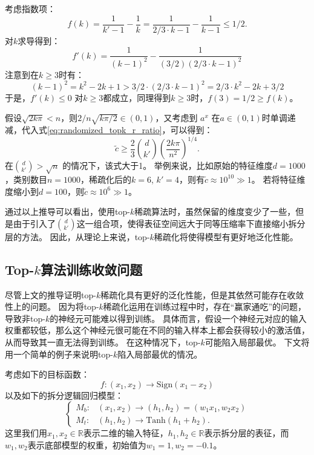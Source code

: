 考虑指数项：
\begin{equation}
    f(k) = \dfrac{1}{k' - 1} - \dfrac{1}{k} = \dfrac{1}{2/3 \cdot k - 1} - \dfrac{1}{k - 1} \le 1/2.
\end{equation}
%
对$k$求导得到：
\begin{equation}
    f'(k) = \dfrac{1}{(k - 1)^2} - \dfrac{1}{(3/2)(2/3 \cdot k - 1)^2}
\end{equation}
%
注意到在$k \ge 3$时有：
\begin{equation}
    (k - 1)^2 = k^2 - 2k + 1 > 3/2 \cdot (2/3\cdot k - 1)^2 = 2/3 \cdot k^2 -2k + 3/2
\end{equation}
%
于是，$f'(k) \le 0$ 对$k \ge 3$都成立，同理得到$k \ge 3$时，$f(3) = 1/2 \ge f(k)$。
%



假设$\sqrt{2k\pi} < n$，则$2/n \sqrt{k\pi/2} \in (0, 1)$，又考虑到 $a^x$ 在$a \in (0, 1)$时单调递减，代入式\eqref{eq:randomized_topk_r_ratio}，可以得到：
\begin{equation}
    \tilde c \ge \dfrac23 {d \choose k'} \left(\dfrac{2k\pi}{n^2}\right)^{1/4}.
\end{equation}
%
在${d \choose k'} > \sqrt{n}$ 的情况下，该式大于1。
%
举例来说，比如原始的特征维度$d = 1000$，类别数目$n = 1000$，稀疏化后的$k = 6$, $k' = 4$，则有$\tilde c \approx 10^{10} \gg 1$。
%
若将特征维度缩小到$d = 100$，则$\tilde c \approx 10^6 \gg 1$。
%

通过以上推导可以看出，使用top-$k$稀疏算法时，虽然保留的维度变少了一些，但是由于引入了${d \choose k'}$这一组合项，使得表征空间远大于同等压缩率下直接缩小拆分层的方法。
%
因此，从理论上来说，top-$k$稀疏化将使得模型有更好地泛化性能。
%


\subsection{Top-$k$算法训练收敛问题}
尽管上文的推导证明top-$k$稀疏化具有更好的泛化性能，但是其依然可能存在收敛性上的问题。
因为将top-$k$稀疏化运用在训练过程中时，存在“赢家通吃”的问题，导致非top-$k$的神经元可能难以得到训练。
%
具体而言，假设一个神经元对应的输入权重都较低，那么这个神经元很可能在不同的输入样本上都会获得较小的激活值，从而导致其一直无法得到训练。
%
在这种情况下，top-$k$可能陷入局部最优。
%
下文将用一个简单的例子来说明top-$k$陷入局部最优的情况。

考虑如下的目标函数：
\begin{equation}
    f: (x_1, x_2) \to \text{Sign}(x_1 - x_2)
\end{equation}
以及如下的拆分逻辑回归模型：
\begin{equation}
\begin{cases}
    M_b: & (x_1, x_2) \to (h_1, h_2) = (w_1x_1, w_2x_2) \\
    M_t: & (h_1, h_2)\rightarrow \text{Tanh}(h_1 + h_2).
\end{cases}
\end{equation}
这里我们用$x_1, x_2 \in \mathbb R$表示二维的输入特征，$h_1, h_2 \in \mathbb R$表示拆分层的表征，而$w_1, w_2$表示底部模型的权重，初始值为$w_1 = 1, w_2 = -0.1$。



